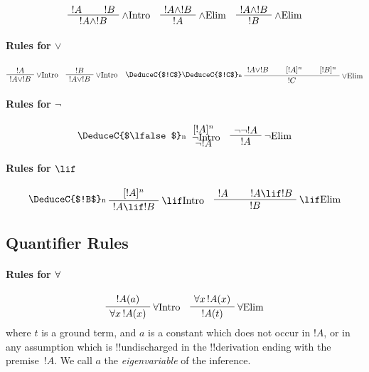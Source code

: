 \documentclass[../../../include/open-logic-section]{subfiles}
\begin{document}
\[
\AxiomC{$!A$}
\AxiomC{$!B$}
\RightLabel{\Intro{\land}}
\BinaryInfC{$!A \land !B$}
\DisplayProof
\quad
\AxiomC{$!A \land !B$}
\RightLabel{\Elim{\land}}
\UnaryInfC{$!A$}
\DisplayProof
\quad
\AxiomC{$!A \land !B$}
\RightLabel{\Elim{\land}}
\UnaryInfC{$!B$}
\DisplayProof
\]

\paragraph{Rules for $\lor$}

\[
\AxiomC{$!A$}
\RightLabel{\Intro{\lor}}
\UnaryInfC{$!A \lor !B$}
\DisplayProof
\quad
\AxiomC{$!B$}
\RightLabel{\Intro{\lor}}
\UnaryInfC{$!A \lor !B$}
\DisplayProof
\quad
\AxiomC{$!A \lor !B$}
\AxiomC{$\Discharge{!A}{n}$}
\DeduceC{$!C$}
\AxiomC{$\Discharge{!B}{n}$}
\DeduceC{$!C$}
\DischargeRule{\Elim{\lor}}{n}
\TrinaryInfC{$!C$}
\DisplayProof
\]

\paragraph{Rules for $\lnot$}

\[
\AxiomC{$\Discharge{!A}{n}$}
\noLine
\DeduceC{$\lfalse$}
\DischargeRule{\Intro{\lnot}}{n}
\UnaryInfC{$\lnot !A$}
\DisplayProof
\quad
\AxiomC{$\lnot \lnot !A$}
\RightLabel{\Elim{\lnot}}
\UnaryInfC{$!A$}
\DisplayProof
\]

\paragraph{Rules for $\lif$}

\[
\AxiomC{$\Discharge{!A}{n}$}
\DeduceC{$!B$}
\DischargeRule{\Intro{\lif}}{n}
\UnaryInfC{$!A \lif !B$}
\DisplayProof
\quad
\AxiomC{$!A$}
\AxiomC{$!A \lif !B$}
\RightLabel{\Elim{\lif}}
\BinaryInfC{$!B$}
\DisplayProof
\]

\subsection{Quantifier Rules}

\paragraph{Rules for $\lforall$}

\[
\AxiomC{$!A(a)$}
\RightLabel{\Intro{\lforall}}
\UnaryInfC{$\lforall[x][!A(x)]$}
\DisplayProof
\quad
\AxiomC{$\lforall[x][!A(x)]$}
\RightLabel{\Elim{\lforall}}
\UnaryInfC{$!A(t)$}
\DisplayProof
\]
where $t$ is a ground term, and $a$ is a constant which does not occur
in $!A$, or in any assumption which is !!{undischarged} in the
!!{derivation} ending with the premise~$!A$. We call $a$ the
\emph{eigenvariable} of the \Intro{\forall} inference.
\end{document}
